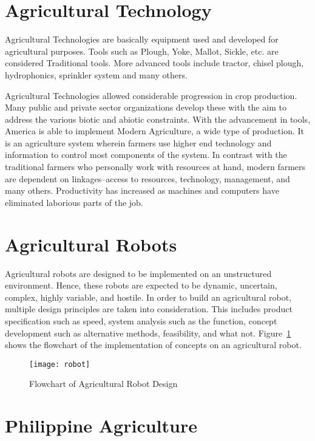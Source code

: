\section{Agricultural Technology}

Agricultural Technologies are basically equipment used and developed for agricultural purposes. Tools such as Plough, Yoke, Mallot, Sickle, etc. are considered Traditional tools. More advanced tools include tractor, chisel plough, hydrophonics, sprinkler system and many others.

	Agricultural Technologies allowed considerable progression in crop production. Many public and private sector organizations develop these with the aim to address the various biotic and abiotic constraints. With the advancement in tools, America is able to implement Modern Agriculture, a wide type of production. It is an agriculture system wherein farmers use higher end technology and information to control most components of the system. In contrast with the traditional farmers who personally work with resources at hand, modern farmers are dependent on linkages--access to resources, technology, management, and many others. Productivity has increased as machines and computers have eliminated laborious parts of the job. ~\cite{Motes}
	
\section{Agricultural Robots}

	Agricultural robots are designed to be implemented on an unstructured environment. Hence, these robots are expected to be dynamic, uncertain, complex, highly variable, and hostile. In order to build an agricultural robot, multiple design principles are taken into consideration. This includes product specification such as speed, system analysis such as the function, concept development such as alternative methods, feasibility, and what not. Figure~\ref{fig:robot} shows the flowchart  of the implementation of concepts on an agricultural robot.~\cite{Edan}

\begin{figure}[!htbp]
	\centering
		\texttt{[image: robot]}
	\caption{Flowchart of Agricultural Robot Design~\cite{Edan}}
	\label{fig:robot}
\end{figure}

\section{Philippine Agriculture}

